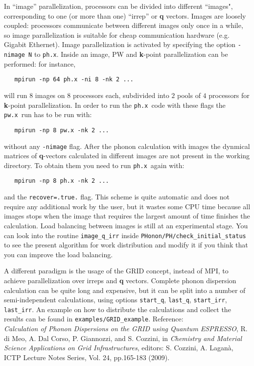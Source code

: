 \documentclass[12pt,a4paper]{article}
\def\pwx{\texttt{pw.x}}
\def\phx{\texttt{ph.x}}
\begin{document}
In  ``image'' parallelization, processors can be divided into different 
``images", corresponding to one (or more than one) ``irrep'' or {\bf q}
vectors. Images are loosely coupled: processors communicate
between different images only once in a while, so image parallelization
is suitable for cheap communication hardware (e.g. Gigabit Ethernet).
Image parallelization is activated by specifying the option 
\texttt{-nimage N} to \phx. Inside an image, PW and {\bf k}-point 
parallelization can be performed: for instance,
\begin{verbatim}
   mpirun -np 64 ph.x -ni 8 -nk 2 ...
\end{verbatim}
will run $8$ images on $8$ processors each, subdivided into $2$ pools 
of $4$ processors for {\bf k}-point parallelization. In order 
to run the \phx\ code with these flags the \pwx\ run has to be run with:
\begin{verbatim}
   mpirun -np 8 pw.x -nk 2 ...
\end{verbatim}
without any {\tt -nimage} flag. 
After the phonon calculation with images the dynmical matrices of 
{\bf q}-vectors calculated in different images are not present in the
working directory. To obtain them you need to run 
\phx\ again with:
\begin{verbatim}
   mpirun -np 8 ph.x -nk 2 ...
\end{verbatim}
and the {\tt recover=.true.} flag. This scheme is quite automatic and
does not require any additional work by the user, but it wastes some 
CPU time because all images stops when the image that requires the 
largest amount of time finishes the calculation. Load balancing 
between images is still at
an experimental stage. You can look into the routine {\tt image\_q\_irr} 
inside {\tt PHonon/PH/check\_initial\_status} to see the present
algorithm for work distribution and modify it if you think that
you can improve the load balancing.

A different paradigm is the usage of the GRID concept, instead of MPI,
to achieve parallelization over irreps and  {\bf q} vectors.
Complete phonon dispersion calculation can be quite long and
expensive, but it can be split into a number of semi-independent
calculations, using options \texttt{start\_q}, \texttt{last\_q},
\texttt{start\_irr}, \texttt{last\_irr}. An example on how to
distribute the calculations and collect the results can be found
in \texttt{examples/GRID\_example}. Reference:\\
{\it Calculation of Phonon Dispersions on the GRID using Quantum
     ESPRESSO},
     R. di Meo, A. Dal Corso, P. Giannozzi, and S. Cozzini, in
     {\it Chemistry and Material Science Applications on Grid Infrastructures},
     editors: S. Cozzini, A. Lagan\`a, ICTP Lecture Notes Series,
     Vol. 24, pp.165-183 (2009).
\end{document}
